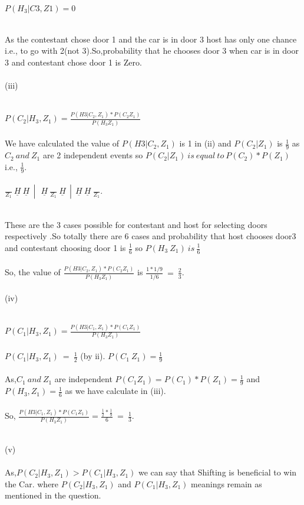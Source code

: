 \documentclass[a4paper]{article}
\begin{document}
\begin{flushleft}
{\begin{center}
$P(H_3|C3,Z1)= 0$\\ \ \\
\end{center}
As the contestant chose door 1 and the car is in door 3 host has only one chance i.e., to go with 2(not 3).So,probability that he chooses door 3 when car is in door 3 and contestant chose door 1 is Zero.\\ \ \\ 
(iii)\\ \ \\
\begin{center}
$P(C_2|H_3,Z_1)=\frac{P(H3|C_2,Z_1)*P(C_2 Z_1)}{P(H_3 Z_1)}$\\ \ \\
We have calculated the value of ${P(H3|C_2,Z_1)}$ is 1 in (ii) and $P(C_2 | Z_1)$ is $\frac{1}{9}$ as $C_2\ and\ Z_1$ are 2 independent events so  $P(C_2 | Z_1)\ is\ equal\ to\ P(C_2)*P(Z_1)$ i.e., $\frac{1}{9}$.\\ \ \\
$\frac{\ }{Z_1}\ \underline{H}\ \underline{H}\ \ |\ \ \ \underline{H}\ \frac{\ }{Z_1}\ \underline{H}\ \ |\ \ \underline{H}\ \underline{H}\  \frac{\ }{Z_1}$.\\ \ \\
\end{center}
These are the 3 cases possible for contestant and host for selecting doors respectively .So totally there are 6 cases and probability that host chooses door3 and contestant choosing door 1 is $\frac{1}{6}$ so $P(H_3\ Z_1)\ is\ \frac{1}{6}$\\ \ \\
So, the value of $\frac{P(H3|C_2,Z_1)*P(C_2 Z_1)}{P(H_3 Z_1)}$ is $\frac{1*1/9}{1/6}\ =\ \frac{2}{3}$.\\ \ \\
(iv)\\ \ \\
\begin{center}
$P(C_1|H_3,Z_1)=\frac{P(H3|C_1,Z_1)*P(C_1 Z_1)}{P(H_3 Z_1)}$\\ \ \\
$P(C_1|H_3,Z_1)\ =\ \frac{1}{2}$ (by ii).
$P(C_1\ Z_1)=\frac{1}{9}$\\ \ \\
As,$C_1\ and\ Z_1$ are independent $P(C_1 Z_1)=P(C_1)*P(Z_1)=\frac{1}{9}$ and $P(H_3,Z_1)=\frac{1}{6}$ as we have calculate in (iii).\\ \ \\
So, $\frac{P(H3|C_1,Z_1)*P(C_1 Z_1)}{P(H_3 Z_1)} = \frac{\frac{1}{2}*\frac{1}{9}}{6}\ =\ \frac{1}{3}$.\\ \ \\
\end{center}
(v)\\ \ \\
As,$P(C_2|H_3,Z_1)>P(C_1|H_3,Z_1)$ we can say that Shifting is beneficial to win the Car.
where $P(C_2|H_3,Z_1)$ and $P(C_1|H_3,Z_1)$ meanings remain as mentioned in the question.\\ \ \\
}
\end{flushleft}
\end{document}

